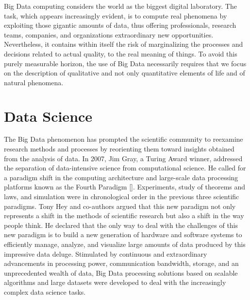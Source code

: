 Big Data computing considers the world as the biggest digital laboratory. The task, which appears increasingly evident, is to compute real phenomena by exploiting those gigantic amounts of data, thus offering professionals, research teams, companies, and organizations extraordinary new opportunities. Nevertheless, it contains within itself the risk of marginalizing the processes and decisions related to actual quality, to the real meaning of things. To avoid this purely measurable horizon, the use of Big Data necessarily requires that we focus on the description of qualitative and not only quantitative elements of life and of natural phenomena.

\section{\label{sec:3.6}Data Science}

The Big Data phenomenon has prompted the
scientific community to reexamine research methods and processes by reorienting them toward insights obtained from the analysis of data. In 2007, Jim Gray, a Turing Award winner, addressed the separation of data-intensive science from computational science. He called for a paradigm shift in the computing architecture and large-scale data processing platforms known as the Fourth Paradigm [\citealt{chap:3:Heyetal:2009}]. Experiments, study of theorems and laws, and simulation were in chronological order in the previous three scientific paradigms. Tony Hey and co-authors argued that this new paradigm not only represents a shift in the methods of scientific research but also a shift in the way people think. He declared that the only way to deal with the challenges of this new paradigm is to build a new generation of hardware and software systems to efficiently manage, analyze, and visualize large amounts of data produced by this impressive data deluge. Stimulated by continuous and extraordinary advancements in processing power, communication bandwidth, storage, and an unprecedented wealth of data, Big Data processing solutions based on scalable algorithms and large datasets were developed to deal with the increasingly complex data science tasks.

